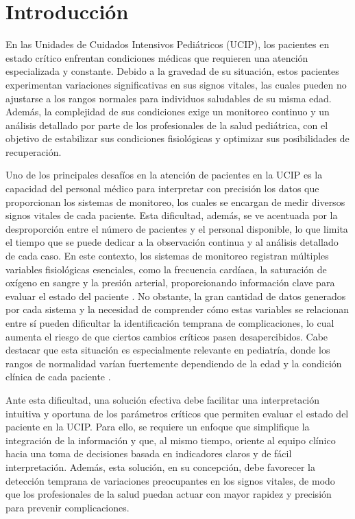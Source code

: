 \chapter{Introducción}


En las Unidades de Cuidados Intensivos Pediátricos (UCIP), los pacientes en estado crítico enfrentan condiciones médicas que requieren una atención especializada y constante. Debido a la gravedad de su situación, estos pacientes experimentan variaciones significativas en sus signos vitales, las cuales pueden no ajustarse a los rangos normales para individuos saludables de su misma edad. Además, la complejidad de sus condiciones exige un monitoreo continuo y un análisis detallado por parte de los profesionales de la salud pediátrica, con el objetivo de estabilizar sus condiciones fisiológicas y optimizar sus posibilidades de recuperación.

Uno de los principales desafíos en la atención de pacientes en la UCIP es la capacidad del personal médico para interpretar con precisión los datos que proporcionan los sistemas de monitoreo, los cuales se encargan de medir diversos signos vitales de cada paciente. Esta dificultad, además, se ve acentuada por la desproporción entre el número de pacientes y el personal disponible, lo que limita el tiempo que se puede dedicar a la observación continua y al análisis detallado de cada caso. En este contexto, los sistemas de monitoreo registran múltiples variables fisiológicas esenciales, como la frecuencia cardíaca, la saturación de oxígeno en sangre y la presión arterial, proporcionando información clave para evaluar el estado del paciente \parencite{Areia2021}. No obstante, la gran cantidad de datos generados por cada sistema y la necesidad de comprender cómo estas variables se relacionan entre sí pueden dificultar la identificación temprana de complicaciones, lo cual aumenta el riesgo de que ciertos cambios críticos pasen desapercibidos. Cabe destacar que esta situación es especialmente relevante en pediatría, donde los rangos de normalidad varían fuertemente dependiendo de la edad y la condición clínica de cada paciente \parencite{Leyton2020}.

Ante esta dificultad, una solución efectiva debe facilitar una interpretación intuitiva y oportuna de los parámetros críticos que permiten evaluar el estado del paciente en la UCIP. Para ello, se requiere un enfoque que simplifique la integración de la información y que, al mismo tiempo, oriente al equipo clínico hacia una toma de decisiones basada en indicadores claros y de fácil interpretación. Además, esta solución, en su concepción, debe favorecer la detección temprana de variaciones preocupantes en los signos vitales, de modo que los profesionales de la salud puedan actuar con mayor rapidez y precisión para prevenir complicaciones.

